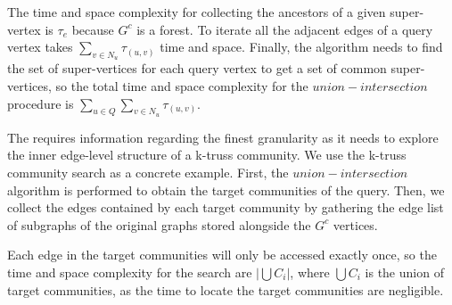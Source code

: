 The time and space complexity for collecting the ancestors of a given super-vertex is $\tau_e$ because $G^c$ is a forest. To iterate all the adjacent edges of a query vertex takes $\sum_{v \in N_u}{\tau_{(u,v)}}$ time and space. Finally, the algorithm needs to find the set of super-vertices for each query vertex to get a set of common super-vertices, so the total time and space complexity for the $union-intersection$ procedure is $\sum_{u \in Q}{\sum_{v \in N_u}{\tau_{(u,v)}}}$. 
%

The \bottomlevelprob{} \probdef{} requires information regarding the finest granularity as it needs to explore the inner edge-level structure of a k-truss community. We use the k-truss community search as a concrete example. First, the $union-intersection$ algorithm is performed to obtain the target communities of the query. Then, we collect the edges contained by each target community by gathering the edge list of subgraphs of the original graphs stored alongside the $G^c$ vertices. %

Each edge in the target communities will only be accessed exactly once, so the time and space complexity for the search are $|\bigcup{C_i}|$, where $\bigcup{C_i}$ is the union of target communities, as the time to locate the target communities are negligible.


 


